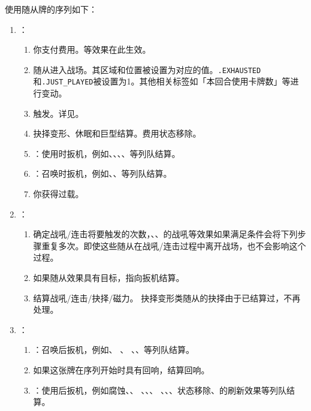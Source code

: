 使用随从牌的序列如下：
\begin{enumerate}
    \item {}：
    \begin{enumerate}
        \item 你支付费用。等效果在此生效。
        \item 随从进入战场。其区域和位置被设置为对应的值。\texttt{.EXHAUSTED}和\texttt{.JUST\_\allowbreak{}PLAYED}被设置为1。其他相关标签如「本回合使用卡牌数」等进行变动。
        \item {}触发。详见。
        \item 抉择变形、休眠和巨型结算。费用状态移除。
        \item {}：使用时扳机，例如、、、、等列队结算。
        \item {}：召唤时扳机，例如、、等列队结算。
        \item 你获得过载。
    \end{enumerate}

    \item {}：
    \begin{enumerate}
        \item 确定战吼/连击将要触发的次数，、、的战吼等效果如果满足条件会将下列步骤重复多次。即使这些随从在战吼/连击过程中离开战场，也不会影响这个过程。
        \item 如果随从效果具有目标，指向扳机结算。
        \item 结算战吼/连击/抉择/磁力。
            \exception 抉择变形类随从的抉择由于已结算过，不再处理。
    \end{enumerate}

    \item {}：
    \begin{enumerate}
        \item {}：召唤后扳机，例如、 、 、、等列队结算。
        \item 如果这张牌在序列开始时具有回响，结算回响。
        \item {}：使用后扳机，例如腐蚀、、 、、、 、、、状态移除、的刷新效果等列队结算。
    \end{enumerate}

\end{enumerate}

